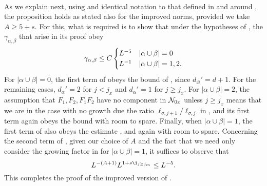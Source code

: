 \paragraph{\cite[Proposition~\ref{IE-prop:1-LTdefXY}]{BS-rg-IE}}
As we explain next, using  and
identical notation to that defined in and around
\cite[Proposition~\ref{IE-prop:1-LTdefXY}]{BS-rg-IE},
the proposition holds as stated also for
the improved norms, provided we take
$A \ge 5+s$.
For this, what is required is to show that under the hypotheses of
\cite[Proposition~\ref{IE-prop:1-LTdefXY}]{BS-rg-IE},
the $\gamma_{\alpha,\beta}$ that arise in its proof obey
\begin{equation}
\lbeq{gamalphbet}
\gamma_{\alpha,\beta} \leq C
  \begin{cases}
  L^{-5} & |\alpha\cup\beta| = 0 \\
  L^{-1}  & |\alpha\cup\beta| = 1, 2.
  \end{cases}
\end{equation}
For $|\alpha\cup\beta| = 0$,
the first term of  obeys the bound of ,
since $d_\varnothing'=d+1$.
For the remaining cases, $d_\alpha'=2$ for $j < j_x$ and $d_\alpha'=1$ for $j \ge j_x$.
For $|\alpha\cup\beta| = 2$, the assumption that $F_1,F_2,F_1F_2$ have no component
in $\mathcal{N}_{0x}$ unless $j \geq j_x$ means that we are in the case with no
growth due the ratio $\ell_{\sigma,j+1}/\ell_{\sigma,j}$ in ,
and its first term again obeys the bound
 with room to spare.
Finally, when $|\alpha\cup\beta| = 1$,
the first term of  also obeys the estimate
, and again with room to spare.
Concerning the second term of , given
our choice of $A$ and the fact that we need only consider the growing factor in
 for $|\alpha\cup\beta|=1$, it suffices to observe that
\begin{equation}
L^{-(A + 1)}
L^{1 + s \1_{j \geq j_m}} \leq L^{- 5}.
\end{equation}
This completes the proof of the improved version of
\cite[Proposition~\ref{IE-prop:1-LTdefXY}]{BS-rg-IE}.


